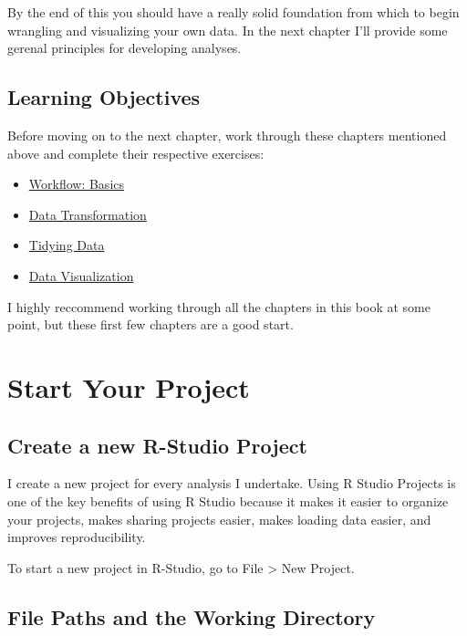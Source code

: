 \documentclass[]{book}
\providecommand{\tightlist}{%
  \setlength{\itemsep}{0pt}\setlength{\parskip}{0pt}}
\begin{document}
By the end of this you should have a really solid foundation from which
to begin wrangling and visualizing your own data. In the next chapter
I'll provide some gerenal principles for developing analyses.

\section{Learning Objectives}\label{learning-objectives}

Before moving on to the next chapter, work through these chapters
mentioned above and complete their respective exercises:

\begin{itemize}
\tightlist
\item
  \href{http://r4ds.had.co.nz/workflow-basics.html}{Workflow: Basics}
\item
  \href{http://r4ds.had.co.nz/transform.html}{Data Transformation}
\item
  \href{http://r4ds.had.co.nz/tidy-data.html}{Tidying Data}
\item
  \href{http://r4ds.had.co.nz/data-visualisation.html\#facets}{Data
  Visualization}
\end{itemize}

I highly reccommend working through all the chapters in this book at
some point, but these first few chapters are a good start.

\chapter{Start Your Project}\label{start-your-project}

\section{Create a new R-Studio
Project}\label{create-a-new-r-studio-project}

I create a new project for every analysis I undertake. Using R Studio
Projects is one of the key benefits of using R Studio because it makes
it easier to organize your projects, makes sharing projects easier,
makes loading data easier, and improves reproducibility.

To start a new project in R-Studio, go to File \textgreater{} New
Project.

\section{File Paths and the Working
Directory}\label{file-paths-and-the-working-directory}
\end{document}
